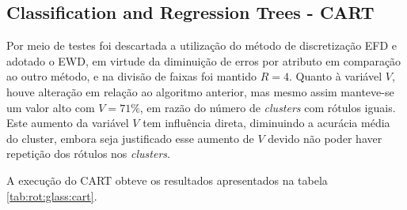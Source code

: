 \subsection{Classification and Regression Trees - CART} \label{cap:resultados:ssec:glass:cart}


Por meio de testes foi descartada a utilização do método de discretização EFD e adotado o EWD, em virtude da diminuição de erros por atributo em comparação ao outro método, e na divisão de faixas foi mantido ${R=4}$. Quanto à variável ${V}$, houve alteração em relação ao algoritmo anterior, mas mesmo assim manteve-se um valor alto com  ${V=71\%}$, em razão do número de \textit{clusters} com rótulos iguais. Este aumento da variável ${V}$ tem influência direta, diminuindo a acurácia média do cluster, embora seja justificado esse aumento de ${V}$ devido não poder haver repetição dos rótulos nos \textit{clusters}. 

A execução do CART obteve os resultados apresentados na tabela \ref{tab:rot:glass:cart}.

